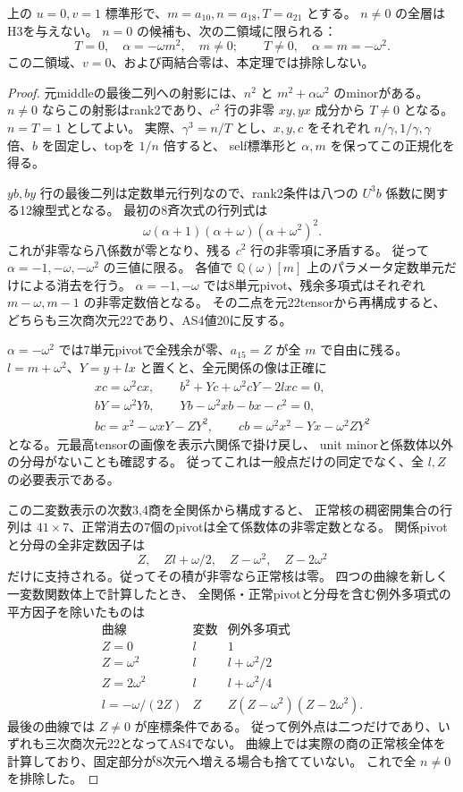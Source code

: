 \begin{theorem}[非退化selfの非零横結合全排除]
\label{thm:cubic-third-root-nonunit-proportional-open-empty}
上の $u=0,v=1$ 標準形で、$m=a_{10},n=a_{18},T=a_{21}$ とする。
$n\ne0$ の全層はH3を与えない。
$n=0$ の候補も、次の二領域に限られる：
\[
 T=0,\quad\alpha=-\omega m^2,\quad m\ne0;
 \qquad
 T\ne0,\quad\alpha=m=-\omega^2.
\]
この二領域、$v=0$、および両結合零は、本定理では排除しない。
\end{theorem}
\begin{proof}
元middleの最後二列への射影には、$n^2$ と $m^2+\alpha\omega^2$ のminorがある。
$n\ne0$ ならこの射影はrank2であり、$c^2$ 行の非零 $xy,yx$ 成分から $T\ne0$ となる。
$n=T=1$ としてよい。
実際、$\gamma^3=n/T$ とし、$x,y,c$ をそれぞれ
$n/\gamma,1/\gamma,\gamma$ 倍、$b$ を固定し、topを $1/n$ 倍すると、
self標準形と $\alpha,m$ を保ってこの正規化を得る。

$yb,by$ 行の最後二列は定数単元行列なので、rank2条件は八つの $U^3b$ 係数に関する12線型式となる。
最初の8斉次式の行列式は
\[
 \omega(\alpha+1)(\alpha+\omega)(\alpha+\omega^2)^2.
\]
これが非零なら八係数が零となり、残る $c^2$ 行の非零項に矛盾する。
従って $\alpha=-1,-\omega,-\omega^2$ の三値に限る。
各値で $\mathbb Q(\omega)[m]$ 上のパラメータ定数単元だけによる消去を行う。
$\alpha=-1,-\omega$ では8単元pivot、残余多項式はそれぞれ $m-\omega,m-1$ の非零定数倍となる。
その二点を元22tensorから再構成すると、どちらも三次商次元22であり、AS4値20に反する。

$\alpha=-\omega^2$ では7単元pivotで全残余が零、$a_{15}=Z$ が全 $m$ で自由に残る。
$l=m+\omega^2$、$Y=y+lx$ と置くと、全元関係の像は正確に
\begin{gather*}
 xc=\omega^2cx,\qquad b^2+Yc+\omega^2cY-2lxc=0,\\
 bY=\omega^2Yb,\qquad Yb-\omega^2xb-bx-c^2=0,\\
 bc=x^2-\omega xY-ZY^2,\qquad
 cb=\omega^2x^2-Yx-\omega^2ZY^2
\end{gather*}
となる。元最高tensorの画像を表示六関係で掛け戻し、
unit minorと係数体以外の分母がないことも確認する。
従ってこれは一般点だけの同定でなく、全 $l,Z$ の必要表示である。

この二変数表示の次数3,4商を全関係から構成すると、
正常核の稠密開集合の行列は $41\times7$、正常消去の7個のpivotは全て係数体の非零定数となる。
関係pivotと分母の全非定数因子は
\[
 Z,\quad Zl+\omega/2,\quad Z-\omega^2,\quad Z-2\omega^2
\]
だけに支持される。従ってその積が非零なら正常核は零。
四つの曲線を新しく一変数関数体上で計算したとき、
全関係・正常pivotと分母を含む例外多項式の平方因子を除いたものは
\[
\begin{array}{c|c|c}
\text{曲線}&\text{変数}&\text{例外多項式}\\\hline
Z=0&l&1\\
Z=\omega^2&l&l+\omega^2/2\\
Z=2\omega^2&l&l+\omega^2/4\\
l=-\omega/(2Z)&Z&Z(Z-\omega^2)(Z-2\omega^2).
\end{array}
\]
最後の曲線では $Z\ne0$ が座標条件である。
従って例外点は二つだけであり、いずれも三次商次元22となってAS4でない。
曲線上では実際の商の正常核全体を計算しており、固定部分が8次元へ増える場合も捨てていない。
これで全 $n\ne0$ を排除した。


\end{proof}
